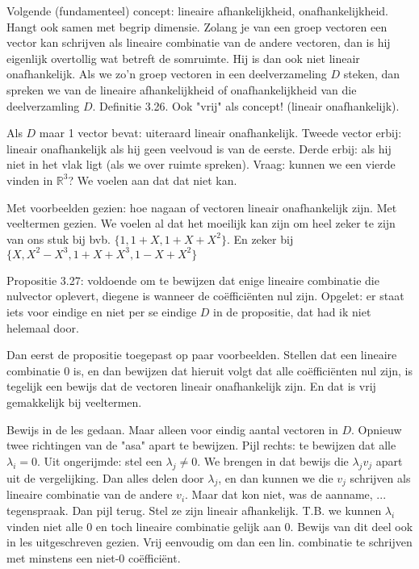 \documentclass{article}
\begin{document}
Volgende (fundamenteel) concept: lineaire afhankelijkheid, onafhankelijkheid. Hangt ook samen met begrip dimensie. Zolang je van een groep vectoren een vector kan schrijven als lineaire combinatie van de andere vectoren, dan is hij eigenlijk overtollig wat betreft de somruimte. Hij is dan ook niet lineair onafhankelijk. Als we zo'n groep vectoren in een deelverzameling $D$ steken, dan spreken we van de lineaire afhankelijkheid of onafhankelijkheid van die deelverzamling $D$. Definitie 3.26. Ook "vrij" als concept! (lineair onafhankelijk). 

Als $D$ maar 1 vector bevat: uiteraard lineair onafhankelijk. Tweede vector erbij: lineair onafhankelijk als hij geen veelvoud is van de eerste. Derde erbij: als hij niet in het vlak ligt (als we over ruimte spreken). Vraag: kunnen we een vierde vinden in $\mathbb{R}^3$? We voelen aan dat dat niet kan. 

Met voorbeelden gezien: hoe nagaan of vectoren lineair onafhankelijk zijn. Met veeltermen gezien. We voelen al dat het moeilijk kan zijn om heel zeker te zijn van ons stuk bij bvb. $\{ 1, 1+X, 1+X+X^2 \}$. En zeker bij  $\{ X,X^2-X^3,  1+X+X^3, 1-X+X^2 \}$

Propositie 3.27: voldoende om te bewijzen dat enige lineaire combinatie die nulvector oplevert, diegene is wanneer de co\"effici\"enten nul zijn. Opgelet: er staat iets voor eindige en niet per se eindige $D$ in de propositie, dat had ik niet helemaal door. 

Dan eerst de propositie toegepast op paar voorbeelden. Stellen dat een lineaire combinatie 0 is, en dan bewijzen dat hieruit volgt dat alle co\"effici\"enten nul zijn, is tegelijk een bewijs dat de vectoren lineair onafhankelijk zijn. 
En dat is vrij gemakkelijk bij veeltermen. 

Bewijs in de les gedaan. Maar alleen voor eindig aantal vectoren in $D$. Opnieuw twee richtingen van de "asa" apart te bewijzen. Pijl rechts: te bewijzen dat alle $\lambda_i=0$. Uit ongerijmde: stel een $\lambda_j \neq 0$. We brengen in dat bewijs die $\lambda_j v_j$ apart uit de vergelijking. Dan alles delen door $\lambda_j$, en dan kunnen we die $v_j$ schrijven als lineaire combinatie van de andere $v_i$. Maar dat kon niet, was de aanname, ... tegenspraak. 
Dan pijl terug. Stel ze zijn lineair afhankelijk. T.B. we kunnen $\lambda_i$ vinden niet alle 0 en toch lineaire combinatie gelijk aan 0. Bewijs van dit deel ook in les uitgeschreven gezien. Vrij eenvoudig om dan een lin. combinatie te schrijven met minstens een niet-0 co\"effici\"ent. 
\end{document}
